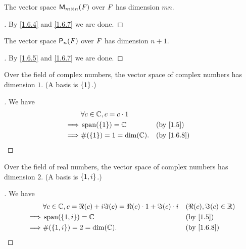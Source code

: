 \begin{eg}\label{1.6.11}
  The vector space \(\mathsf{M}_{{m} \times n}({\mathit{F}})\) over \(\mathit{F}\) has dimension \(mn\).
\end{eg}

\begin{proof}[]
  By \cref{1.6.4} and \cref{1.6.7} we are done.
\end{proof}

\begin{eg}\label{1.6.12}
  The vector space \(\ps[n]{\F}\) over \(\mathit{F}\) has dimension \(n + 1\).
\end{eg}

\begin{proof}[]
  By \cref{1.6.5} and \cref{1.6.7} we are done.
\end{proof}

\begin{eg}\label{1.6.13}
  Over the field of complex numbers, the vector space of complex numbers has dimension \(1\).
  (A basis is \(\left\lbrace1\right\rbrace\).)
\end{eg}

\begin{proof}[]
  We have
  \begin{align*}
             & \forall c \in \C, c = c \cdot 1                               \\
    \implies & \spn{\set{1}} = \C              &  & \text{(by \cref{1.5})}   \\
    \implies & \#\pa{\set{1}} = 1 = \dim(\C).  &  & \text{(by \cref{1.6.8})}
  \end{align*}
\end{proof}

\begin{eg}\label{1.6.14}
  Over the field of real numbers, the vector space of complex numbers has dimension \(2\).
  (A basis is \(\left\lbrace1, i\right\rbrace\).)
\end{eg}

\begin{proof}[]
  We have
  \begin{align*}
             & \forall c \in \C, c = \Re(c) + i \Im(c) = \Re(c) \cdot 1 + \Im(c) \cdot i &  & (\Re(c), \Im(c) \in \R)  \\
    \implies & \spn{\set{1, i}} = \C                                                     &  & \text{(by \cref{1.5})}   \\
    \implies & \#\pa{\set{1, i}} = 2 = \dim(\C).                                         &  & \text{(by \cref{1.6.8})}
  \end{align*}
\end{proof}

